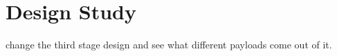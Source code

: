 
\chapter{Design Study}

change the third stage design and see what different payloads come out of it. 




